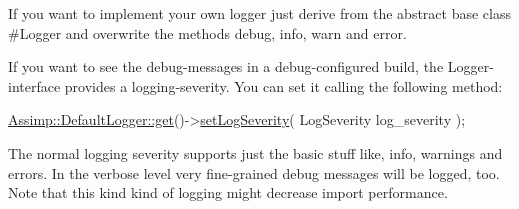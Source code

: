 If you want to implement your own logger just derive from the abstract base class \#\+Logger and overwrite the methods debug, info, warn and error.

If you want to see the debug-\/messages in a debug-\/configured build, the Logger-\/interface provides a logging-\/severity. You can set it calling the following method\+:


\begin{DoxyCode}
\hyperlink{class_assimp_1_1_default_logger_a093cac26b06553ac774f84769cb0d691}{Assimp::DefaultLogger::get}()->\hyperlink{class_assimp_1_1_logger_a8fb4fa4c2c329a36ac39bc9c743925f1}{setLogSeverity}( LogSeverity 
      log\_severity );
\end{DoxyCode}


The normal logging severity supports just the basic stuff like, info, warnings and errors. In the verbose level very fine-\/grained debug messages will be logged, too. Note that this kind kind of logging might decrease import performance. 